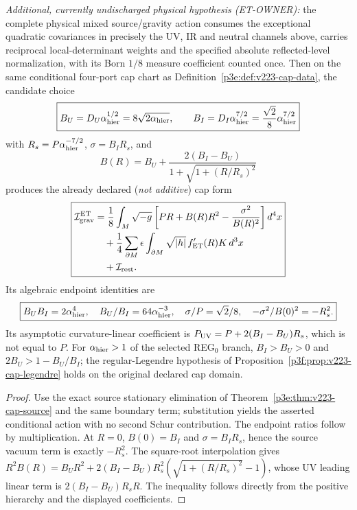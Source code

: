 \documentclass[12pt,a4paper]{article}
\begin{document}
\begin{proposition}
\label{p3e:prop:et-conditional-cap}
\emph{Additional, currently undischarged physical hypothesis
(ET-OWNER):} the complete physical mixed source/gravity action
consumes the exceptional quadratic covariances in precisely the
UV, IR and neutral channels above, carries reciprocal local-determinant
weights and the specified absolute reflected-level normalization,
with its Born $1/8$ measure coefficient counted once.
Then on the same conditional four-port cap chart as
Definition~\ref{p3e:def:v223-cap-data}, the candidate choice
\[
 \boxed{ B_U=D_U\alpha_{\rm hier}^{1/2}=8\sqrt{2\alpha_{\rm hier}},
 \qquad B_I=D_I\alpha_{\rm hier}^{7/2}
 =\frac{\sqrt2}{8}\alpha_{\rm hier}^{7/2} }
\]
with $R_s=P\alpha_{\rm hier}^{-7/2}$,
$\sigma=B_IR_s$, and
\[
 B(R)=B_U+\frac{2(B_I-B_U)}{1+\sqrt{1+(R/R_s)^2}}
\]
produces the already declared (\emph{not additive}) cap form
\[
 \boxed{\begin{aligned}
 \mathcal I_{\rm grav}^{\rm ET}
 &=\frac18\int_M\sqrt{-g}\left[PR+B(R)R^2
 -\frac{\sigma^2}{B(R)^2}\right]d^4x\\
 &\quad+\frac14\sum_{\partial M}\epsilon\int_{\partial M}
 \sqrt{|h|}\,f_{\rm ET}'(R)K\,d^3x\\
 &\quad+\mathcal I_{\rm rest}.
 \end{aligned}}
\]
Its algebraic endpoint identities are
\[
 \boxed{B_UB_I=2\alpha_{\rm hier}^{4},\quad
 B_U/B_I=64\alpha_{\rm hier}^{-3},\quad
 \sigma/P=\sqrt2/8,\quad
 -\sigma^2/B(0)^2=-R_s^2.}
\]
Its asymptotic curvature-linear coefficient is
$P_{\rm UV}=P+2(B_I-B_U)R_s$, which is not equal to $P$.
For $\alpha_{\rm hier}>1$ of the selected REG$_0$ branch,
$B_I>B_U>0$ and $2B_U>1-B_U/B_I$; the regular-Legendre
hypothesis of Proposition~\ref{p3f:prop:v223-cap-legendre}
holds on the original declared cap domain.
\end{proposition}
\begin{proof}
Use the exact source stationary elimination of
Theorem~\ref{p3e:thm:v223-cap-source} and the same boundary term;
substitution yields the asserted conditional action with no second
Schur contribution.  The endpoint ratios follow by multiplication.
At $R=0$, $B(0)=B_I$ and $\sigma=B_IR_s$, hence the source
vacuum term is exactly $-R_s^2$.  The square-root interpolation gives
$R^2B(R)=B_UR^2+2(B_I-B_U)R_s^2
(\sqrt{1+(R/R_s)^2}-1)$, whose UV leading linear term is
$2(B_I-B_U)R_s R$.  The inequality follows directly from the
positive hierarchy and the displayed coefficients.
\end{proof}
\end{document}
